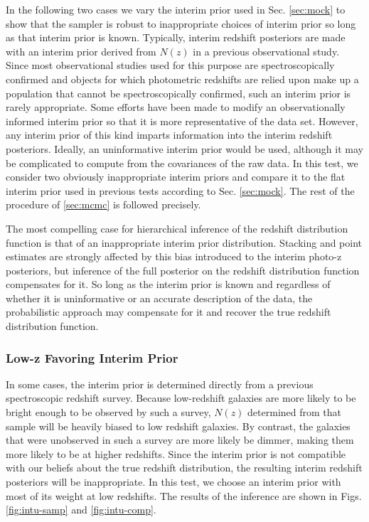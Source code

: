\documentclass[preprint]{aastex}
\begin{document}
In the following two cases we vary the interim prior used in Sec. 
\ref{sec:mock} to show that the sampler is robust to inappropriate choices of 
interim prior so long as that interim prior is known.  Typically, interim 
redshift posteriors are made with an interim prior derived from $N(z)$ in a 
previous observational study.  Since most observational studies used for this 
purpose are spectroscopically confirmed and objects for which photometric 
redshifts are relied upon make up a population that cannot be spectroscopically 
confirmed, such an interim prior is rarely appropriate.  Some efforts have been 
made to modify an observationally informed interim prior so that it is more 
representative of the data set.  \citep{Sheldon2012}  However, any interim 
prior of this kind imparts information into the interim redshift posteriors.  
Ideally, an uninformative interim prior would be used, although it may be 
complicated to compute from the covariances of the raw data.  In this test, we 
consider two obviously inappropriate interim priors and compare it to the flat 
interim prior used in previous tests according to Sec. \ref{sec:mock}.  The 
rest of the procedure of \ref{sec:mcmc} is followed precisely.

The most compelling case for hierarchical inference of the redshift 
distribution function is that of an inappropriate interim prior distribution.  
Stacking and point estimates are strongly affected by this bias introduced to 
the interim photo-z posteriors, but inference of the full posterior on the 
redshift distribution function compensates for it.  So long as the interim 
prior is known and regardless of whether it is uninformative or an accurate 
description of the data, the probabilistic approach may compensate for it and 
recover the true redshift distribution function.

\subsubsection{Low-z Favoring Interim Prior}
\label{sec:lowz}

In some cases, the interim prior is determined directly from a previous 
spectroscopic redshift survey.  Because low-redshift galaxies are more likely 
to be bright enough to be observed by such a survey, $N(z)$ determined from 
that sample will be heavily biased to low redshift galaxies.  By contrast, the 
galaxies that were unobserved in such a survey are more likely be dimmer, 
making them more likely to be at higher redshifts.  Since the interim prior is 
not compatible with our beliefs about the true redshift distribution, the 
resulting interim redshift posteriors will be inappropriate.  In this test, we 
choose an interim prior with most of its weight at low redshifts.  The results 
of the inference are shown in Figs. \ref{fig:intu-samp} and \ref{fig:intu-comp}.
\end{document}
